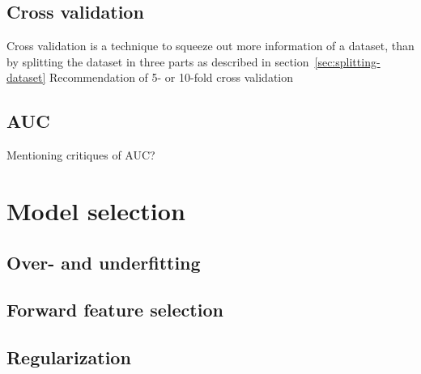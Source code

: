 \subsection{Cross validation}
Cross validation is a technique to squeeze out more information of a dataset, than by splitting the dataset in three parts as described in section~\ref{sec:splitting-dataset}
Recommendation of 5- or 10-fold cross validation \citep[p.243]{hastie09}
\subsection{AUC}\label{sec:theory:auc}
Mentioning critiques of AUC?


\section{Model selection}
\subsection{Over- and underfitting}
\subsection{Forward feature selection}
\subsection{Regularization}
